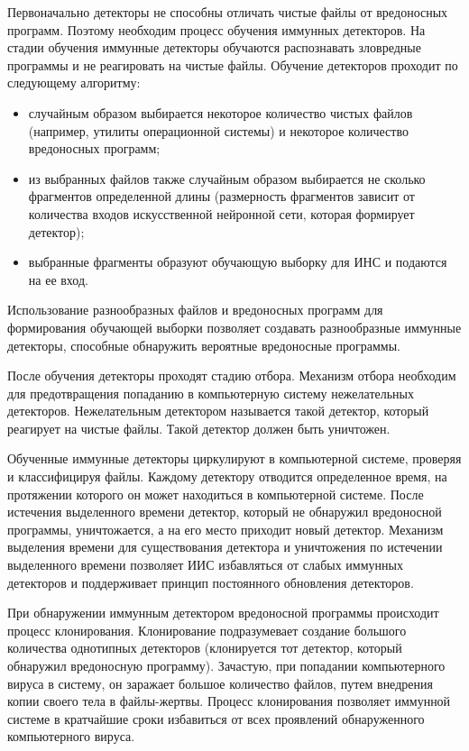\documentclass[bachelor, och, referat]{template}
\begin{document}
Первоначально детекторы не способны отличать чистые файлы от вре­доносных 
программ. Поэтому необходим процесс обучения иммунных
детекторов. На стадии обучения иммунные детекторы обучаются распознавать 
зловредные программы и не реагировать на чистые файлы. Обу­чение 
детекторов проходит по следующему алгоритму:

\begin{itemize}
    \item случайным образом выбирается некоторое количество чистых фай­лов 
    (например, утилиты операционной системы) и некоторое количество
    вредоносных программ;
    \item из выбранных файлов также случайным образом выбирается не­
    сколько фрагментов определенной длины (размерность фрагментов зави­сит 
    от количества входов искусственной нейронной сети, которая форми­рует 
    детектор);
    \item выбранные фрагменты образуют обучающую выборку для ИНС и
    подаются на ее вход.
\end{itemize}

Использование разнообразных файлов и вредоносных программ для
формирования обучающей выборки позволяет создавать разнообразные
иммунные детекторы, способные обнаружить вероятные вредоносные
программы.

После обучения детекторы проходят стадию отбора. Механизм отбора
необходим для предотвращения попаданию в компьютерную систему 
не­желательных детекторов. Нежелательным детектором называется такой
детектор, который реагирует на чистые файлы. Такой детектор должен
быть уничтожен.

Обученные иммунные детекторы циркулируют в компьютерной сис­теме, 
проверяя и классифицируя файлы. Каждому детектору отводится
определенное время, на протяжении которого он может находиться в
компьютерной системе. После истечения выделенного времени детектор,
который не обнаружил вредоносной программы, уничтожается, а на его
место приходит новый детектор. Механизм выделения времени для 
существования детектора и уничтожения по истечении выделенного времени
позволяет ИИС избавляться от слабых иммунных детекторов и поддержи­вает 
принцип постоянного обновления детекторов.

При обнаружении иммунным детектором вредоносной программы
происходит процесс клонирования. Клонирование подразумевает созда­ние 
большого количества однотипных детекторов (клонируется тот детек­тор, 
который обнаружил вредоносную программу). Зачастую, при попа­дании 
компьютерного вируса в систему, он заражает большое количество
файлов, путем внедрения копии своего тела в файлы-жертвы. Процесс
клонирования позволяет иммунной системе в кратчайшие сроки изба­виться 
от всех проявлений обнаруженного компьютерного вируса.
\end{document}
